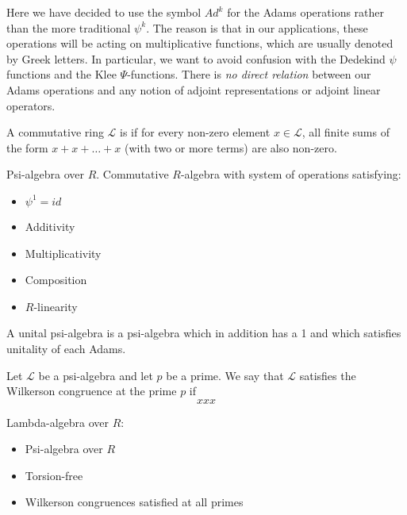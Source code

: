 \documentclass[a4paper]{article}
\begin{document}
\begin{remark}
Here we have decided to use the symbol $Ad^k$ for the Adams operations rather than the more traditional $\psi^k$. The reason is that in our applications, these operations will be acting on multiplicative functions, which are usually denoted by Greek letters. In particular, we want to avoid confusion with the Dedekind $\psi$ functions and the Klee $\Psi$-functions. There is \emph{no direct relation} between our Adams operations and any notion of adjoint representations or adjoint linear operators.
\end{remark}

\begin{definition}
A commutative ring $\mathcal{L}$ is  if for every non-zero element $x \in \mathcal{L}$, all finite sums of the form $x+x+ \ldots +x$ (with two or more terms) are also non-zero.
\end{definition}

\begin{definition}
Psi-algebra over $R$. Commutative $R$-algebra with system of operations satisfying:
\begin{itemize}
\item $\psi^1 = id$
\item Additivity
\item Multiplicativity
\item Composition
\item $R$-linearity
\end{itemize}
A unital psi-algebra is a psi-algebra which in addition has a 1 and which satisfies unitality of each Adams.
\end{definition}


\begin{definition}
Let $\mathcal{L}$ be a psi-algebra and let $p$ be a prime. We say that $\mathcal{L}$ satisfies the Wilkerson congruence at the prime $p$ if
$$   xxx   $$
\end{definition}

\begin{definition}
Lambda-algebra over $R$:
\begin{itemize}
\item Psi-algebra over $R$
\item Torsion-free
\item Wilkerson congruences satisfied at all primes

\end{itemize}
\end{definition}
\end{document}
